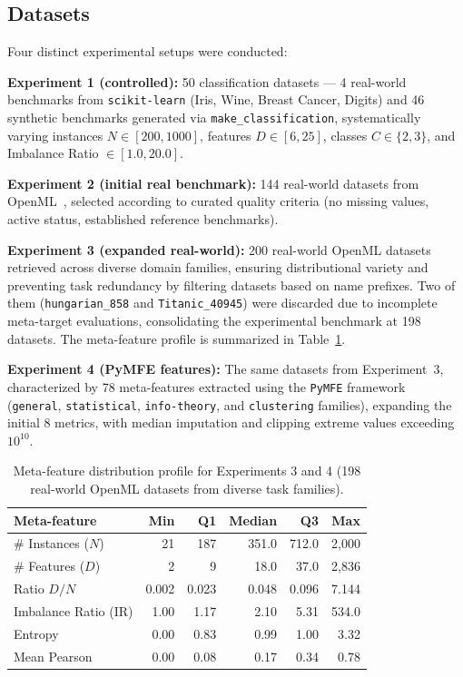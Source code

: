\documentclass[12pt]{article}
\begin{document}
\subsection{Datasets}

Four distinct experimental setups were conducted:

\textbf{Experiment 1 (controlled):} 50 classification datasets --- 4 real-world benchmarks from \texttt{scikit-learn} (Iris, Wine, Breast Cancer, Digits) and 46 synthetic benchmarks generated via \texttt{make\_classification}, systematically varying instances $N \in [200, 1000]$, features $D \in [6, 25]$, classes $C \in \{2, 3\}$, and Imbalance Ratio $\in [1.0, 20.0]$.

\textbf{Experiment 2 (initial real benchmark):} 144 real-world datasets from OpenML~\cite{vanschoren2014openml}, selected according to curated quality criteria (no missing values, active status, established reference benchmarks).

\textbf{Experiment 3 (expanded real-world):} 200 real-world OpenML datasets retrieved across diverse domain families, ensuring distributional variety and preventing task redundancy by filtering datasets based on name prefixes. Two of them (\texttt{hungarian\_858} and \texttt{Titanic\_40945}) were discarded due to incomplete meta-target evaluations, consolidating the experimental benchmark at 198 datasets. The meta-feature profile is summarized in Table~\ref{tab:metadataset_profile}.

\textbf{Experiment 4 (PyMFE features):} The same datasets from Experiment~3, characterized by 78 meta-features extracted using the \texttt{PyMFE} framework~\cite{pymfe2020} (\texttt{general}, \texttt{statistical}, \texttt{info-theory}, and \texttt{clustering} families), expanding the initial 8 metrics, with median imputation and clipping extreme values exceeding $10^{10}$.

\begin{table}[ht]
\centering
\caption{Meta-feature distribution profile for Experiments 3 and 4 (198 real-world OpenML datasets from diverse task families).}
\label{tab:metadataset_profile}
\small
\begin{tabular}{lrrrrr}
\toprule
\textbf{Meta-feature} & \textbf{Min} & \textbf{Q1} & \textbf{Median} & \textbf{Q3} & \textbf{Max} \\
\midrule
\# Instances ($N$)   & 21    & 187    & 351.0   & 712.0    & 2,000 \\
\# Features ($D$)    & 2     & 9      & 18.0    & 37.0     & 2,836 \\
Ratio $D/N$          & 0.002 & 0.023  & 0.048   & 0.096    & 7.144 \\
Imbalance Ratio (IR)  & 1.00  & 1.17   & 2.10    & 5.31     & 534.0 \\
Entropy              & 0.00  & 0.83   & 0.99    & 1.00     & 3.32  \\
Mean Pearson         & 0.00  & 0.08   & 0.17    & 0.34     & 0.78  \\
\bottomrule
\end{tabular}
\end{table}
\end{document}
